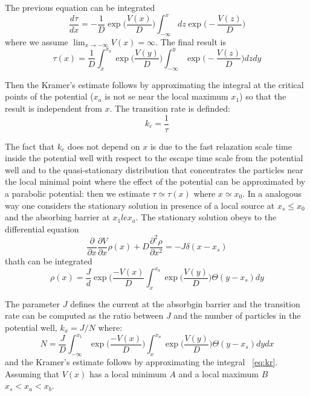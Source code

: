 The previous equation can be integrated
$$
\frac{d\tau}{dx} = - \frac{1}{D} \exp \biggl(\frac{V(x)}{D}\biggr) \int_{-\infty}^x dz \exp \biggl(-\frac{V(z)}{D}\biggr)
$$
where we assume $\lim_{x\to - \infty} V(x) = \infty$. The final result is 
\begin{equation}
\tau(x) = \frac{1}{D} \int_x^{x_a} \exp \biggl(\frac{V(y)}{D}\biggr) \int _{-\infty}^y \exp\biggl(-\frac{V(z)}{D}\biggr) dzdy
\end{equation}

Then the Kramer's estimate follows by approximating the integral at the critical points of the potential ($x_a$ is not se near the local maximum $x_1$) so that the result is independent from $x$. The transition rate is definded:
$$
k_c = \frac{1}{\tau}
$$

The fact that $k_c$ does not depend on $x$ is due to the fast relazation scale time inside the potential well with respect to the escape time scale from the potential well and to the quasi-stationary distribution that concentrates the particles near the local minimal point where the effect of the potential can be approximated by a parabolic potential: then we estimate $\tau \simeq \tau(x)$ where $x \simeq x_0$.
In a analogous way one considers the stationary solution in presence of a local source at $x_s \le x_0 $ and the absorbing barrier at $x_1 le x_a$. The stationary solution obeys to the differential equation 
$$
\frac{\partial}{\partial x}\frac{\partial V}{\partial x} \rho(x) + D \frac{\partial^2 \rho}{\partial x^2} = -J \delta(x-x_s)
$$ 
thath can be integrated 
$$
\rho(x) = \frac{J}{d} \exp \biggl(\frac{-V(x)}{D}\int_x^{x_a} \exp \biggl(\frac{V(y)}{D}\biggr) \Theta(y-x_s) dy
$$

The parameter $J$ defines the current at the absorbgin barrier and the transition rate can be computed as the ratio between $J$ and the number of particles in the potential well, $k_x = J/N$ where:
\begin{equation}
N = \frac{J}{D} \int_{-\infty}^{x_1} \exp \biggl(\frac{-V(x)}{D} \biggr) \int_x^{x_a} \exp \biggl(\frac{V(y)}{D} \biggr) \Theta (y-x_s) dydx
\label{eq:kr}
\end{equation}
and the Kramer's estimate follows by approximating the integral ~\ref{eq:kr}. Assuming that $V(x)$ has a local minimum $A$ and a local maximum $B$ $x_s < x_a <x_b $. 
